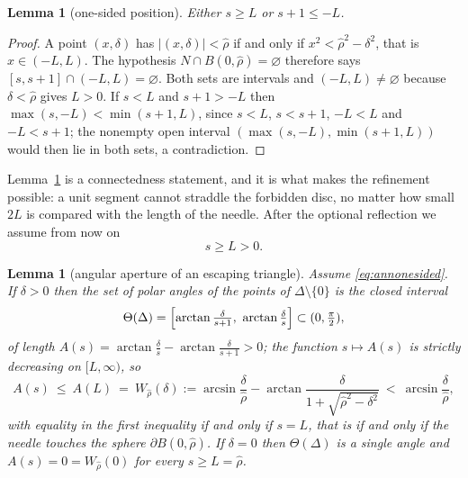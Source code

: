 \documentclass[11pt]{article}
\theoremstyle{plain}
\newtheorem{lemma}[theorem]{Lemma}
\theoremstyle{definition}
\theoremstyle{remark}
\begin{document}
\begin{lemma}[one-sided position]\label{lem:annonesided}
Either $s\ge L$ or $s+1\le-L$.
\end{lemma}

\begin{proof}
A point $(x,\delta)$ has $|(x,\delta)|<\hat\rho$ if and only if
$x^{2}<\hat\rho^{2}-\delta^{2}$, that is $x\in(-L,L)$. The hypothesis
$N\cap B(0,\hat\rho)=\varnothing$ therefore says $[s,s+1]\cap(-L,L)=\varnothing$.
Both sets are intervals and $(-L,L)\neq\varnothing$ because $\delta<\hat\rho$
gives $L>0$. If $s<L$ and $s+1>-L$ then $\max(s,-L)<\min(s+1,L)$, since
$s<L$, $s<s+1$, $-L<L$ and $-L<s+1$; the nonempty open interval
$(\max(s,-L),\min(s+1,L))$ would then lie in both sets, a contradiction.
\end{proof}

Lemma~\ref{lem:annonesided} is a connectedness statement, and it is what makes
the refinement possible: a unit segment cannot straddle the forbidden disc, no
matter how small $2L$ is compared with the length of the needle. After the
optional reflection we assume from now on
\begin{equation}\label{eq:annonesided}
  s\ge L>0 .
\end{equation}

\begin{lemma}[angular aperture of an escaping triangle]\label{lem:annwidth}
Assume \eqref{eq:annonesided}. If $\delta>0$ then the set of polar angles of
the points of $\Delta\setminus\{0\}$ is the closed interval
\[
  \Theta(\Delta)
  =\Bigl[\arctan\tfrac{\delta}{s+1},\ \arctan\tfrac{\delta}{s}\Bigr]
  \subset(0,\tfrac{\pi}{2}),
\]
of length $A(s)=\arctan\frac{\delta}{s}-\arctan\frac{\delta}{s+1}>0$; the
function $s\mapsto A(s)$ is strictly decreasing on $[L,\infty)$, so
\begin{equation}\label{eq:annWrho}
  A(s)\ \le\ A(L)\ =\ W_{\hat\rho}(\delta)
  :=\arcsin\frac{\delta}{\hat\rho}
   -\arctan\frac{\delta}{1+\sqrt{\hat\rho^{2}-\delta^{2}}}
  \ <\ \arcsin\frac{\delta}{\hat\rho},
\end{equation}
with equality in the first inequality if and only if $s=L$, that is if and only
if the needle touches the sphere $\partial B(0,\hat\rho)$. If $\delta=0$ then
$\Theta(\Delta)$ is a single angle and $A(s)=0=W_{\hat\rho}(0)$ for every
$s\ge L=\hat\rho$.
\end{lemma}
\end{document}
